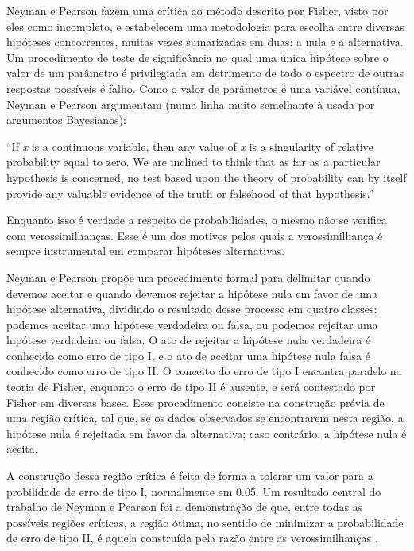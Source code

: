Neyman e Pearson fazem uma crítica ao método descrito por Fisher, visto por eles como incompleto, e estabelecem uma metodologia
para escolha entre diversas hipóteses concorrentes, muitas vezes sumarizadas em duas: a nula e a alternativa.
Um procedimento de teste de significância
no qual uma única hipótese sobre o valor de um parâmetro é privilegiada em detrimento de todo o espectro de outras respostas
possíveis é falho. Como o valor de parâmetros é uma variável contínua, Neyman e Pearson argumentam (numa linha muito semelhante
à usada por argumentos Bayesianos):

``If {\em x} is a continuous variable, then any value of {\em x} is a singularity of relative probability equal to zero. We are
inclined to think that as far as a particular hypothesis is concerned, no test based upon the theory of probability can by
itself provide any valuable evidence of the truth or falsehood of that hypothesis.''\cite{Neyman1933}

Enquanto isso é verdade a respeito de probabilidades, o mesmo não se verifica com verossimilhanças. Esse é um dos motivos
pelos quais a verossimilhança é sempre instrumental em comparar hipóteses alternativas.

Neyman e Pearson propõe um procedimento formal para delimitar quando devemos aceitar e quando devemos rejeitar a hipótese
nula em favor de uma hipótese alternativa, dividindo o resultado desse processo em quatro classes: podemos aceitar uma hipótese
verdadeira ou falsa, ou podemos rejeitar uma hipótese verdadeira ou falsa. O ato de rejeitar a hipótese nula verdadeira
é conhecido como erro de tipo I, e o ato de aceitar uma hipótese nula falsa é conhecido como erro de tipo II. O conceito do 
erro de tipo I encontra paralelo na teoria de Fisher, enquanto o erro de tipo II é ausente, e será contestado por Fisher em
diversas bases. Esse procedimento consiste na construção prévia de uma região crítica, tal que, se os dados observados se
encontrarem nesta região, a hipótese nula é rejeitada em favor da alternativa; caso contrário, a hipótese nula é aceita.

A construção dessa região crítica é feita de forma a tolerar um valor para a probilidade de erro de tipo I, normalmente em
0.05. Um resultado central do trabalho de Neyman e Pearson foi a demonstração de que, entre todas as possíveis regiões críticas,
a região ótima, no sentido de minimizar a probabilidade de erro de tipo II, é aquela construída pela razão entre as 
verossimilhanças \cite{Neyman1933}. 

